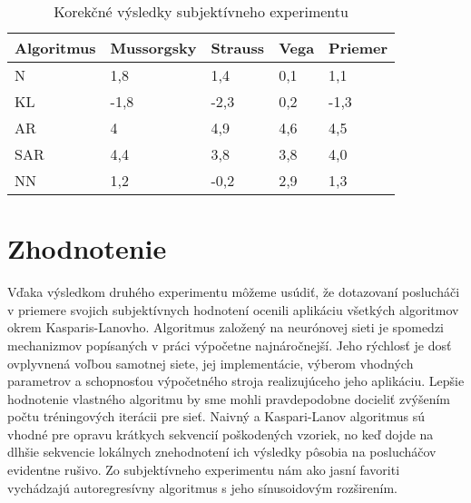 \begin{table}[!h]
\centering
\caption{Korekčné výsledky subjektívneho experimentu}
\begin{tabular}{l l l l l}
\hline
Algoritmus & Mussorgsky & Strauss & Vega & Priemer\\
\hline
N & 1,8 & 1,4 & 0,1 & 1,1\\
KL & -1,8 & -2,3 & 0,2 & -1,3\\
AR & 4 & 4,9 & 4,6 & 4,5\\
SAR & 4,4 & 3,8 & 3,8 & 4,0\\
NN & 1,2 & -0,2 & 2,9 & 1,3\\
\hline
\end{tabular}
\label{tabulka:subjektivny}
\end{table}

\section{Zhodnotenie}
Vďaka výsledkom druhého experimentu môžeme usúdiť, že dotazovaní poslucháči v priemere svojich subjektívnych hodnotení ocenili aplikáciu všetkých algoritmov okrem Kasparis-Lanovho. Algoritmus založený na neurónovej sieti je spomedzi mechanizmov popísaných v práci výpočetne najnáročnejší. Jeho rýchlosť je dosť ovplyvnená voľbou samotnej siete, jej implementácie, výberom vhodných parametrov a schopnosťou výpočetného stroja realizujúceho jeho aplikáciu. Lepšie hodnotenie vlastného algoritmu by sme mohli pravdepodobne docieliť zvýšením počtu tréningových iterácii pre sieť. Naivný a Kaspari-Lanov algoritmus sú vhodné pre opravu krátkych sekvencií poškodených vzoriek, no keď dojde na dlhšie sekvencie lokálnych znehodnotení ich výsledky pôsobia na poslucháčov evidentne rušivo. Zo subjektívneho experimentu nám ako jasní favoriti vychádzajú autoregresívny algoritmus s jeho sínusoidovým rozširením.